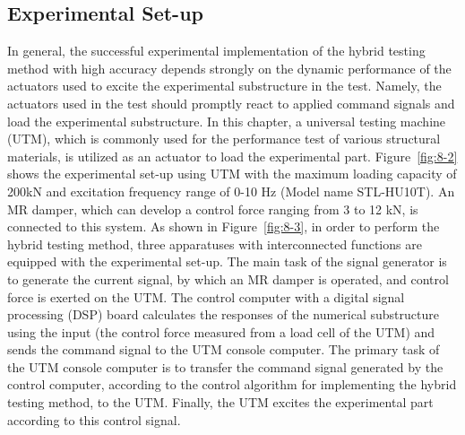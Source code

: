 \subsection{Experimental Set-up}
In general, the successful experimental implementation of the hybrid testing method with high accuracy depends strongly on the dynamic performance of the actuators used to excite the experimental substructure in the test. Namely, the actuators used in the test should promptly react to applied command signals and load the experimental substructure. In this chapter, a universal testing machine (UTM), which is commonly used for the performance test of various structural materials, is utilized as an actuator to load the experimental part. Figure~\ref{fig:8-2} shows the experimental set-up using UTM with the maximum loading capacity of 200kN and excitation frequency range of 0-10 Hz (Model name STL-HU10T). An MR damper, which can develop a control force ranging from 3 to 12 kN, is connected to this system. As shown in Figure~\ref{fig:8-3}, in order to perform the hybrid testing method, three apparatuses with interconnected functions are equipped with the experimental set-up. The main task of the signal generator is to generate the current signal, by which an MR damper is operated, and control force is exerted on the UTM. The control computer with a digital signal processing (DSP) board calculates the responses of the numerical substructure using the input (the control force measured from a load cell of the UTM) and sends the command signal to the UTM console computer. The primary task of the UTM console computer is to transfer the command signal generated by the control computer, according to the control algorithm for implementing the hybrid testing method, to the UTM. Finally, the UTM excites the experimental part according to this control signal.

